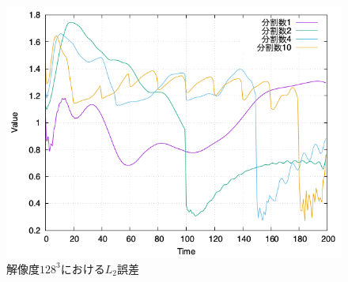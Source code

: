\documentclass[a4j,12pt]{jreport}
\begin{document}
\begin{figure}[htbp]
\centering
\includegraphics[width=140mm]{images/128error.png}
\caption{$解像度128^3におけるL_2誤差$}
\label{fig:128error}
\end{figure}
\end{document}
